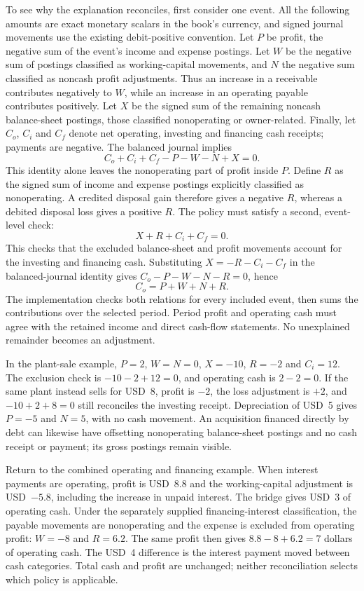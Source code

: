 To see why the explanation reconciles, first consider one event. All the
following amounts are exact monetary scalars in the book's currency, and signed
journal movements use the existing debit-positive convention. Let $P$ be profit,
the negative sum of the event's income and expense postings. Let $W$ be the
negative sum of postings classified as working-capital movements, and $N$ the
negative sum classified as noncash profit adjustments. Thus an increase in a
receivable contributes negatively to $W$, while an increase in an operating
payable contributes positively. Let $X$ be the signed sum of the remaining
noncash balance-sheet postings, those classified nonoperating or owner-related.
Finally, let $C_o$, $C_i$ and $C_f$ denote net operating, investing and financing
cash receipts; payments are negative. The balanced journal implies
\[
 C_o+C_i+C_f-P-W-N+X=0.
\]
This identity alone leaves the nonoperating part of profit inside $P$. Define
$R$ as the signed sum of income and expense postings explicitly classified as
nonoperating. A credited disposal gain therefore gives a negative $R$, whereas
a debited disposal loss gives a positive $R$. The policy must satisfy a second,
event-level check:
\[
 X+R+C_i+C_f=0.
\]
This checks that the excluded balance-sheet and profit movements account for
the investing and financing cash. Substituting
$X=-R-C_i-C_f$ in the balanced-journal identity gives
$C_o-P-W-N-R=0$, hence
\[
 C_o=P+W+N+R.
\]
The implementation checks both relations for every included event, then sums
the contributions over the selected period. Period profit and operating cash
must agree with the retained income and direct cash-flow statements. No
unexplained remainder becomes an adjustment.

In the plant-sale example, $P=2$, $W=N=0$, $X=-10$, $R=-2$ and $C_i=12$.
The exclusion check is $-10-2+12=0$, and operating cash is $2-2=0$.
If the same plant instead sells for USD~8, profit is $-2$, the loss adjustment
is $+2$, and $-10+2+8=0$ still reconciles the investing receipt. Depreciation
of USD~5 gives $P=-5$ and $N=5$, with no cash movement. An acquisition financed
directly by debt can likewise have offsetting nonoperating balance-sheet
postings and no cash receipt or payment; its gross postings remain visible.

Return to the combined operating and financing example. When interest payments
are operating, profit is USD~8.8 and the working-capital adjustment is
USD~$-5.8$, including the increase in unpaid interest. The bridge gives
USD~3 of operating cash. Under the separately supplied financing-interest
classification, the payable movements are nonoperating and the expense is
excluded from operating profit: $W=-8$ and $R=6.2$. The same profit then gives
$8.8-8+6.2=7$ dollars of operating cash. The USD~4 difference is the interest
payment moved between cash categories. Total cash and profit are unchanged;
neither reconciliation selects which policy is applicable.


